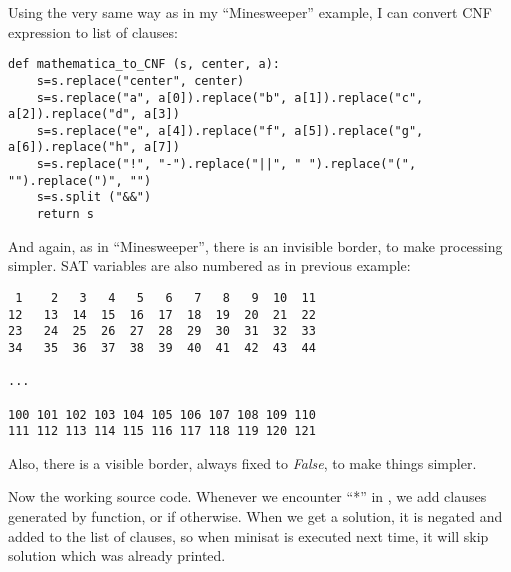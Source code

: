 Using the very same way as in my ``Minesweeper'' example, I can convert \ac{CNF} expression to list of clauses:

\begin{lstlisting}
def mathematica_to_CNF (s, center, a):
    s=s.replace("center", center)
    s=s.replace("a", a[0]).replace("b", a[1]).replace("c", a[2]).replace("d", a[3])
    s=s.replace("e", a[4]).replace("f", a[5]).replace("g", a[6]).replace("h", a[7])
    s=s.replace("!", "-").replace("||", " ").replace("(", "").replace(")", "")
    s=s.split ("&&")
    return s
\end{lstlisting}

And again, as in ``Minesweeper'', there is an invisible border, to make processing simpler.
\ac{SAT} variables are also numbered as in previous example:

\begin{lstlisting}
 1    2   3   4   5   6   7   8   9  10  11
12   13  14  15  16  17  18  19  20  21  22
23   24  25  26  27  28  29  30  31  32  33
34   35  36  37  38  39  40  41  42  43  44

...

100 101 102 103 104 105 106 107 108 109 110
111 112 113 114 115 116 117 118 119 120 121
\end{lstlisting}

Also, there is a visible border, always fixed to \textit{False}, to make things simpler.

Now the working source code.
Whenever we encounter ``*'' in , we add clauses generated by  function,
or  if otherwise.
When we get a solution, it is negated and added to the list of clauses, so when minisat is executed next time,
it will skip solution which was already printed.

